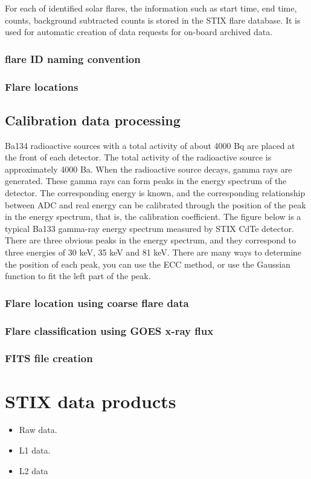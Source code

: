 \documentclass{aa}
\begin{document}
For each of identified solar flares,   the  information such as start time, end time, counts, background subtracted counts is stored in the STIX flare database.   It is used for automatic creation of data requests for on-board archived data. 

\subsubsection{flare ID naming convention}
\subsubsection{Flare locations}
\subsection{Calibration data processing}

Ba134 radioactive sources with a total activity of about 4000 Bq are placed at the front of each detector. The total activity of the radioactive source is approximately 4000 Ba.
When the radioactive source decays, gamma rays are generated. These gamma rays can form peaks in the energy spectrum of the detector.
The corresponding energy is known, and the corresponding relationship between ADC and real energy can be calibrated through the position of the peak in the energy spectrum, that is, the calibration coefficient. The figure below is a typical Ba133 gamma-ray energy spectrum measured by STIX CdTe detector. There are three obvious peaks in the energy spectrum, and they correspond to three energies of 30 keV, 35 keV and 81 keV. There are many ways to determine the position of each peak, you can use the ECC method, or use the Gaussian function to fit the left part of the peak.

\subsubsection{Flare location using coarse flare data}
\subsubsection{Flare classification using GOES x-ray flux}
\subsubsection{FITS file creation}
\section{STIX data products}
\begin{itemize}
    \item Raw data.
    \item L1 data.
    \item L2 data
    
\end{itemize}
\end{document}

